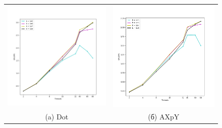 \documentclass[12pt, a4paper]{article}
\begin{document}
\iffalse
\begin{figure}[H]
	\center
	\begin{tabular}{cc}
		\includegraphics[width=85mm]{multithread_polus_dot} & \includegraphics[width=85mm]{multithread_polus_axpy} \\
		(a) Dot & (б) AXpY \\

\end{tabular}
\end{figure}
\end{document}
